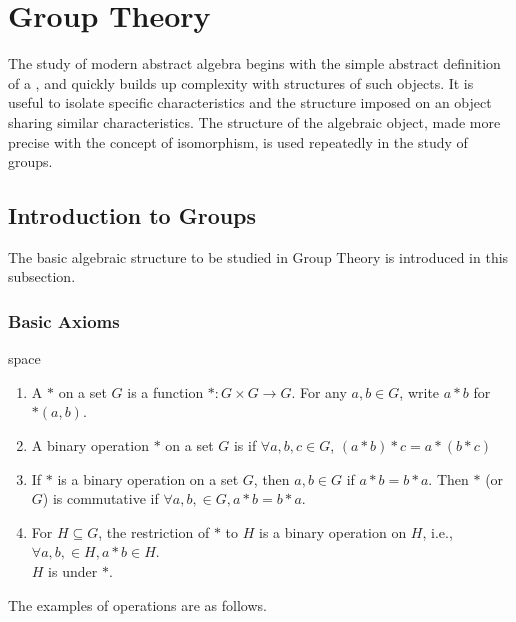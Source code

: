 \section{Group Theory}

The study of modern abstract algebra begins with the simple abstract definition of a , and quickly builds up complexity with structures of such objects. It is useful to isolate specific characteristics and the structure imposed on an object sharing similar characteristics. The structure of the algebraic object, made more precise with the concept of isomorphism, is used repeatedly in the study of groups.

\subsection{Introduction to Groups}

The basic algebraic structure to be studied in Group Theory is introduced in this subsection.

\subsubsection{Basic Axioms}

\begin{definition}{\color{white}space}
\begin{enumerate}[label=(\roman*)]
\setlength{\itemsep}{0pt}
\item A  $*$ on a set $G$ is a function $*: G \times G \rightarrow G$. For any $a,b \in G$, write $a * b$ for $*(a,b)$.
\item A binary operation $*$ on a set $G$ is  if $\forall a,b,c \in G$, $(a*b)*c = a*(b*c)$
\item If $*$ is a binary operation on a set $G$, then $a,b \in G$  if $a*b = b*a$. Then $*$ (or $G$) is commutative if $\forall a,b,\in G, a*b = b*a$.
\item For $H \subseteq G$, the restriction of $*$ to $H$ is a binary operation on $H$, i.e., $\forall a,b, \in H, a*b \in H$. \\
    $H$ is  under $*$.
\end{enumerate}
\end{definition}

The examples of operations are as follows.

